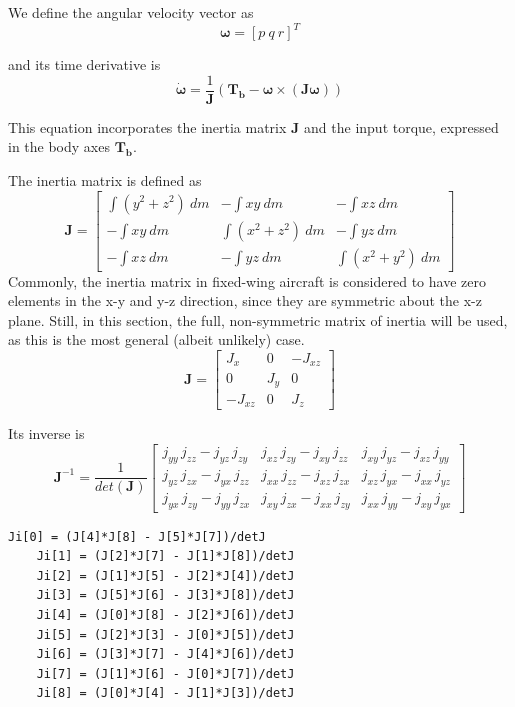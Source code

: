 We define the angular velocity vector as
\begin{equation}
	\bm{\omega} = [p\ q\ r]^T
\end{equation}

and its time derivative is
\begin{equation}  \label{eq:angVelDer}
	\dot{\bm{\omega}} = \frac{1}{\bm{J}}\left(\bm{T_b} - \bm{\omega} \times (\bm{J} \bm{\omega})\right)
\end{equation}

This equation incorporates the inertia matrix $\bm{J}$ and the input torque, expressed in the body axes $\bm{T_b}$.

The inertia matrix is defined as
\begin{equation}
	\bm{J} =
	\begin{bmatrix}
		\int(y^2 + z^2)~dm & -\int xy~dm        & -\int xz~dm        \\
		-\int xy~dm        & \int(x^2 + z^2)~dm & -\int yz~dm        \\
		-\int xz~dm        & -\int yz~dm        & \int(x^2 + y^2)~dm
	\end{bmatrix}
\end{equation}
%
Commonly, the inertia matrix in fixed-wing aircraft is considered to have zero elements in the x-y and y-z direction, since they are symmetric about the x-z plane.
Still, in this section, the full, non-symmetric matrix of inertia will be used, as this is the most general (albeit unlikely) case.
%
\begin{equation}\label{eq:inertiaMat}
	\bm{J} = 
	\begin{bmatrix}
		J_x     & 0   & -J_{xz} \\
		0       & J_y & 0       \\
		-J_{xz} & 0   & J_z
	\end{bmatrix}
\end{equation}

Its inverse is
\begin{equation}
	\bm{J}^{-1} = \frac{1}{det(\bm{J})}
	\begin{bmatrix}
		{j}_{yy}\, {j}_{zz} - {j}_{yz}\, {j}_{zy} & {j}_{xz}\, {j}_{zy} - {j}_{xy}\, {j}_{zz} & {j}_{xy}\, {j}_{yz} - {j}_{xz}\, {j}_{yy}\\
		{j}_{yz}\, {j}_{zx} - {j}_{yx}\, {j}_{zz} & {j}_{xx}\, {j}_{zz} - {j}_{xz}\, {j}_{zx} & {j}_{xz}\, {j}_{yx} - {j}_{xx}\, {j}_{yz}\\
		{j}_{yx}\, {j}_{zy} - {j}_{yy}\, {j}_{zx} & {j}_{xy}\, {j}_{zx} - {j}_{xx}\, {j}_{zy} & {j}_{xx}\, {j}_{yy} - {j}_{xy}\, {j}_{yx}
	\end{bmatrix}
\end{equation}
\begin{lstlisting}[style=C-style]
	Ji[0] = (J[4]*J[8] - J[5]*J[7])/detJ
	Ji[1] = (J[2]*J[7] - J[1]*J[8])/detJ
	Ji[2] = (J[1]*J[5] - J[2]*J[4])/detJ
	Ji[3] = (J[5]*J[6] - J[3]*J[8])/detJ
	Ji[4] = (J[0]*J[8] - J[2]*J[6])/detJ
	Ji[5] = (J[2]*J[3] - J[0]*J[5])/detJ
	Ji[6] = (J[3]*J[7] - J[4]*J[6])/detJ
	Ji[7] = (J[1]*J[6] - J[0]*J[7])/detJ
	Ji[8] = (J[0]*J[4] - J[1]*J[3])/detJ
\end{lstlisting}

